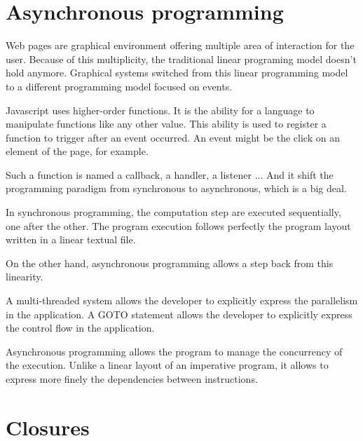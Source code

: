 \section{Asynchronous programming}

Web pages are graphical environment offering multiple area of interaction for the user.
Because of this multiplicity, the traditional linear programing model doesn't hold anymore.
Graphical systems switched from this linear programming model to a different programming model focused on events.

Javascript uses higher-order functions.
It is the ability for a language to manipulate functions like any other value.
This ability is used to register a function to trigger after an event occurred.
An event might be the click on an element of the page, for example.

Such a function is named a callback, a handler, a listener ...
And it shift the programming paradigm from synchronous to asynchronous, which is a big deal.

In synchronous programming, the computation step are executed sequentially, one after the other.
The program execution follows perfectly the program layout written in a linear textual file.

On the other hand, asynchronous programming allows a step back from this linearity.


A multi-threaded system allows the developer to explicitly express the parallelism in the application.
A GOTO statement allows the developer to explicitly express the control flow in the application.


Asynchronous programming allows the program to manage the concurrency of the execution.
Unlike a linear layout of an imperative program, it allows to express more finely the dependencies between instructions.









\section{Closures}


